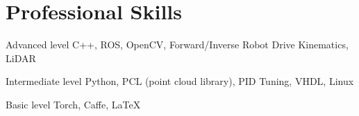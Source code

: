 \documentclass{tccv}
\begin{document}
\section{Professional Skills}
\begin{factlist}

\item{Advanced  level}
     {C++, ROS, OpenCV, Forward/Inverse Robot Drive Kinematics, LiDAR}

\item{Intermediate level}
     {Python, PCL (point cloud library), PID Tuning, VHDL, Linux}

\item{Basic level}
     {Torch, Caffe, \LaTeX}

\end{factlist}
\end{document}
